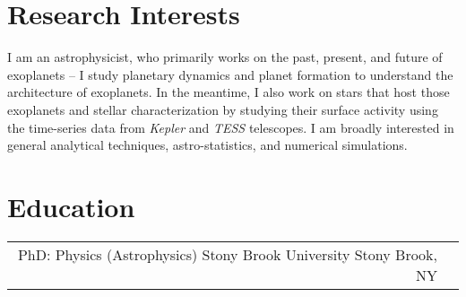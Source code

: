 \documentclass[10pt]{article} %
\begin{document}
\begin{paracol}{1}


\section{Research Interests}
I am an astrophysicist, who primarily works on the past, present, and future of exoplanets -- I study planetary dynamics and planet formation to understand the architecture of exoplanets. 
In the meantime, I also work on stars that host those exoplanets and stellar characterization by studying
their surface activity using the time-series data from \textit{Kepler} and \textit{TESS} telescopes. 
I am broadly interested in general analytical techniques, astro-statistics, and numerical simulations. 


\section{Education} 





\begin{supertabular}{rl} %

	
	
	
	{PhD:} %
	{Physics (Astrophysics)} %
	{} %
	{Stony Brook University} %
	{Stony Brook, NY}


\end{supertabular}
\end{paracol}
\end{document}

